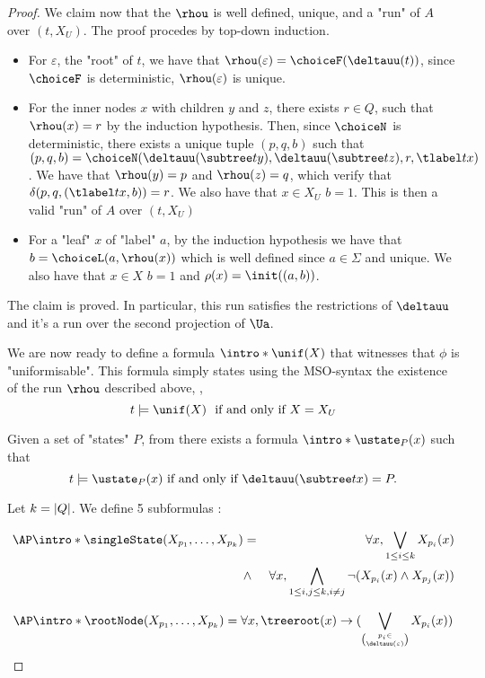 \documentclass[a4paper,UKenglish,cleveref, autoref, thm-restate]{lipics-v2021}
\begin{document}
\begin{proof}
	We claim now that the $\rhou$ is well defined, unique, and a "run" of $A$ over $(t,X_U)$. The proof procedes by top-down induction.
	\begin{itemize}
		\item For $\varepsilon$, the "root" of $t$, we have that $\rhou(\varepsilon) = \choiceF(\deltauu(t))$, since $\choiceF$ is deterministic, $\rhou(\varepsilon)$ is unique.
		\item For the inner nodes $x$ with children $y$ and $z$, there exists $r \in Q$, such that $\rhou (x) = r$ by the induction hypothesis. Then,
		      since $\choiceN$ is deterministic, there exists a unique tuple $(p,q,b)$ such that
		      $(p,q,b) = \choiceN(\deltauu(\subtree t y), \deltauu(\subtree t z), r, \tlabel t x)$.
		      We have that $\rhou(y) = p$ and $\rhou(z) = q$, which verify that $\delta(p,q,(\tlabel t x,b)) = r$. We also have that $x \in X_U$ \tiff $b = 1$.
		      This is then a valid "run" of $A$ over $(t,X_U)$
		\item For a "leaf" $x$ of "label" $a$, by the induction hypothesis we have that $b = \choiceL(a, \rhou(x))$ which is well defined since $a \in \Sigma$ and unique.
		      We also have that $x \in X$ \tiff $b = 1$ and $\rho(x) = \init ((a,b))$.
	\end{itemize}
	The claim is proved. In particular, this run satisfies the restrictions of $\deltauu$ and it's a run over the second projection of $\Ua$.

	\AP We are now ready to define a formula $\intro*\unif (X)$ that witnesses that $\phi$ is "uniformisable".
	This formula simply states using the MSO-syntax the existence of the run $\rhou$ described above, \ie,
	\[  t \models \unif(X) \text{ \tiff } X=X_U \]


	\AP Given a set of "states" $P$, from  there exists a formula $\intro* \ustate_P(x)$ such that
	\[ t \models \ustate_P(x) \text{ if and only if } \deltauu(\subtree t x) = P .\]

	Let $k = \left|Q\right|$.
	We define 5 subformulas :

	\begin{eqnarray*}
		\AP \intro* \singleState (X_{p_1}, \ldots, X_{p_k})  &=& \forall x, \bigvee_{1 \leq i \leq k} X_{p_i} (x)\\
		&\land& \forall x, \bigwedge_{1 \leq i, j \leq k, i \neq j} \lnot(X_{p_i} (x) \land X_{p_j}(x))
	\end{eqnarray*}

	\begin{equation*}
		\AP \intro*	\rootNode (X_{p_1}, \ldots, X_{p_k})  = \forall x, \treeroot(x) \ra (\bigvee_{p_i \in \choose \deltauu(\varepsilon)} X_{p_i}(x))
	\end{equation*}


\end{proof}
\end{document}
